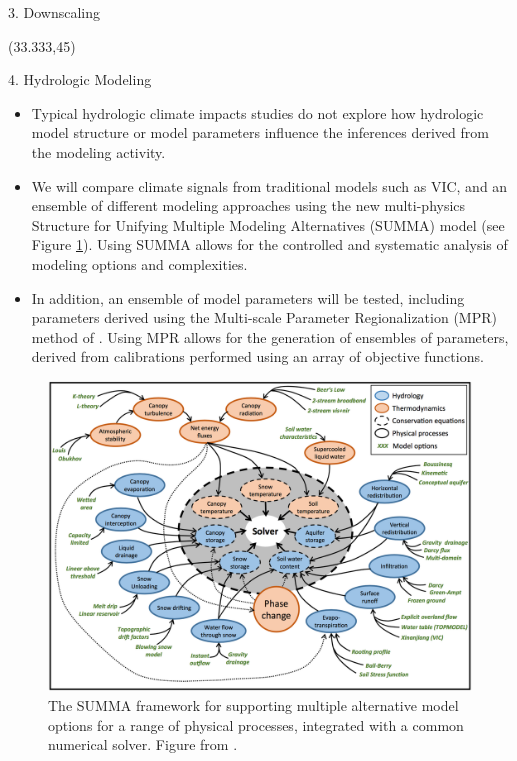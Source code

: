\documentclass{beamer}
\begin{document}
\begin{frame}{}
\begin{columns}
\begin{column}{.3333\paperwidth}
\begin{textblock}{\textwidth \TPHorizModule}
\begin{block}{3. Downscaling}
    \end{block}

   \end{textblock}



   \begin{textblock}{\textwidth \TPHorizModule}(33.333,45)
    \begin{block}{4. Hydrologic Modeling}

        \vspace{-0.5cm}
        \begin{itemize}
         \justifying
         \item Typical hydrologic climate impacts studies do not explore how hydrologic model structure or model parameters influence the inferences derived from the modeling activity.
         \item We will compare climate signals from traditional models such as VIC, and an ensemble of different modeling approaches using the new multi-physics Structure for Unifying Multiple Modeling Alternatives (SUMMA) model \citep{Clark_2015} (see Figure \ref{fig:summa}). Using SUMMA allows for the controlled and systematic analysis of modeling options and complexities.
         \item In addition, an ensemble of model parameters will be tested, including parameters derived using the Multi-scale Parameter Regionalization (MPR) method of \citet{Samaniego_2010}. Using MPR allows for the generation of ensembles of parameters, derived from calibrations performed using an array of objective functions.
        \end{itemize}

     \begin{figure}
      \center\includegraphics[width=0.6\linewidth]{figures/summa.png}
      \caption{The SUMMA framework for supporting multiple alternative model options for a range of physical processes, integrated with a common numerical solver. Figure from \citet{Clark_2015}.}
      \label{fig:summa}
     \end{figure}


\end{block}
\end{textblock}
\end{column}
\end{columns}
\end{frame}
\end{document}
